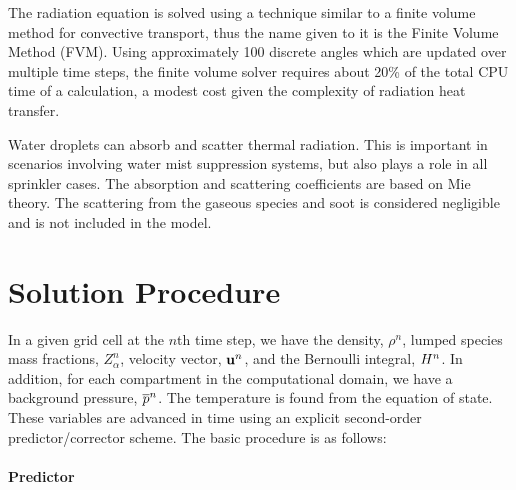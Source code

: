 The radiation equation is solved using a technique similar to a finite volume method for convective transport, thus the name given to it is the Finite Volume Method (FVM). Using approximately 100 discrete angles which are updated over multiple time steps, the finite volume solver requires about 20\% of the total CPU time of a calculation, a modest cost given the complexity of radiation heat transfer.

Water droplets can absorb and scatter thermal radiation. This is important in scenarios involving water mist suppression systems, but also plays a role in all sprinkler cases. The absorption and scattering coefficients are based on Mie theory. The scattering from the gaseous species and soot is considered negligible and is not included in the model.



\section{Solution Procedure}
\label{sec:solution_procedure}

In a given grid cell at the $n$th time step, we have the density, $\rho^n$, lumped species mass fractions, $Z_\alpha^n$, velocity
vector, ${\mathbf{u}}^n$, and the Bernoulli integral, $H^n$.
In addition, for each compartment in the computational domain, we have a background pressure, $\overline{p}^n$. The temperature is
found from the equation of state. These variables are advanced in time using an explicit second-order predictor/corrector scheme.
The basic procedure is as follows:

\paragraph{Predictor}

